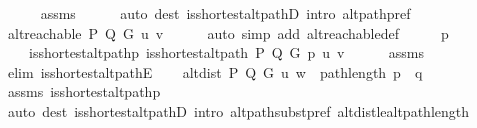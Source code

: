 \begin{isabellebody}
\ \ \ \ \isamarkupfalse%
\ assms{\isacharparenleft}{\kern0pt}{}{\isacharparenright}{\kern0pt}\isanewline
\ \ \ \ \isamarkupfalse%
\ {\isacharparenleft}{\kern0pt}auto\ dest{\isacharcolon}{\kern0pt}\ is{\isacharunderscore}{\kern0pt}shortest{\isacharunderscore}{\kern0pt}alt{\isacharunderscore}{\kern0pt}pathD{\isacharparenleft}{\kern0pt}{}{\isacharparenright}{\kern0pt}\ intro{\isacharcolon}{\kern0pt}\ alt{\isacharunderscore}{\kern0pt}path{\isacharunderscore}{\kern0pt}pref{\isacharparenright}{\kern0pt}\isanewline
\ \ \isamarkupfalse%
\ {\isachardoublequoteopen}alt{\isacharunderscore}{\kern0pt}reachable\ P\ Q\ G\ u\ v{\isachardoublequoteclose}\isanewline
\ \ \ \ \isamarkupfalse%
\ {\isacharparenleft}{\kern0pt}auto\ simp\ add{\isacharcolon}{\kern0pt}\ alt{\isacharunderscore}{\kern0pt}reachable{\isacharunderscore}{\kern0pt}def{\isacharparenright}{\kern0pt}\isanewline
\ \ \isamarkupfalse%
\ \isamarkupfalse%
\ p{\isacharprime}{\kern0pt}\ \isanewline
\ \ \ \ is{\isacharunderscore}{\kern0pt}shortest{\isacharunderscore}{\kern0pt}alt{\isacharunderscore}{\kern0pt}path{\isacharunderscore}{\kern0pt}p{\isacharprime}{\kern0pt}{\isacharcolon}{\kern0pt}\ {\isachardoublequoteopen}is{\isacharunderscore}{\kern0pt}shortest{\isacharunderscore}{\kern0pt}alt{\isacharunderscore}{\kern0pt}path\ P\ Q\ G\ p{\isacharprime}{\kern0pt}\ u\ v{\isachardoublequoteclose}\isanewline
\ \ \ \ \isamarkupfalse%
\ assms{\isacharparenleft}{\kern0pt}{}{\isacharparenright}{\kern0pt}\isanewline
\ \ \ \ \isamarkupfalse%
\ {\isacharparenleft}{\kern0pt}elim\ is{\isacharunderscore}{\kern0pt}shortest{\isacharunderscore}{\kern0pt}alt{\isacharunderscore}{\kern0pt}pathE{\isacharparenright}{\kern0pt}\isanewline
\isanewline
\ \ \isamarkupfalse%
\ {\isachardoublequoteopen}alt{\isacharunderscore}{\kern0pt}dist\ P\ Q\ G\ u\ w\ {\isasymle}\ path{\isacharunderscore}{\kern0pt}length\ {\isacharparenleft}{\kern0pt}p{\isacharprime}{\kern0pt}\ {\isacharat}{\kern0pt}\ q{\isacharparenright}{\kern0pt}{\isachardoublequoteclose}\isanewline
\ \ \ \ \isamarkupfalse%
\ assms\ is{\isacharunderscore}{\kern0pt}shortest{\isacharunderscore}{\kern0pt}alt{\isacharunderscore}{\kern0pt}path{\isacharunderscore}{\kern0pt}p{\isacharprime}{\kern0pt}\isanewline
\ \ \ \ \isamarkupfalse%
\ {\isacharparenleft}{\kern0pt}auto\ dest{\isacharcolon}{\kern0pt}\ is{\isacharunderscore}{\kern0pt}shortest{\isacharunderscore}{\kern0pt}alt{\isacharunderscore}{\kern0pt}pathD{\isacharparenleft}{\kern0pt}{}{\isacharparenright}{\kern0pt}\ intro{\isacharcolon}{\kern0pt}\ alt{\isacharunderscore}{\kern0pt}path{\isacharunderscore}{\kern0pt}subst{\isacharunderscore}{\kern0pt}pref\ alt{\isacharunderscore}{\kern0pt}dist{\isacharunderscore}{\kern0pt}le{\isacharunderscore}{\kern0pt}alt{\isacharunderscore}{\kern0pt}path{\isacharunderscore}{\kern0pt}length{\isacharparenright}{\kern0pt}\isanewline

\end{isabellebody}
